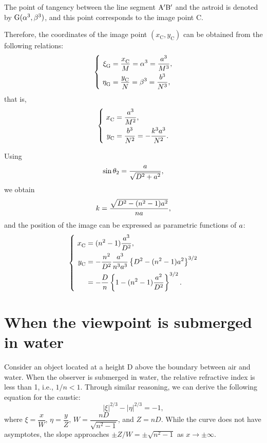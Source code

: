 \documentclass[twocolumn]{article}
\begin{document}
The point of tangency between the line segment ${\mathrm{{A^{\prime}}{B^{\prime}}}}$ and the astroid is denoted by $\mathrm{G}({\alpha}^3, {\beta}^3)$, and this point corresponds to the image point C. 

Therefore, the coordinates of the image point $(x_{\mathrm{C}}^{}, y_{\mathrm{C}}^{})$ can be obtained from the following relations:
$$ \left\{ 
\begin{aligned}
	\xi_{\mathrm{G}}^{} &= \dfrac{x_{\mathrm{C}}^{}}{M} = \greeka^3 = \dfrac{\romana^3}{M^3},\\
	\eta_{\mathrm{G}}^{} &= \dfrac{y_{\mathrm{C}}^{}}{N} = \greekb^3 = \dfrac{\romanb^3}{N^3},
\end{aligned}
\right.$$
that is,
$$\left\{ 
\begin{aligned}
	x_{\mathrm{C}}^{} &= \dfrac{\romana^3}{M^2},\\
	y_{\mathrm{C}}^{} &= \dfrac{\romanb^3}{N^2}=-\dfrac{k^3\romana^3}{N^2}.
\end{aligned}
\right.$$

Using 
$$\sin\theta_2 = \dfrac{{a}}{\sqrt{D^2+{a}^2}},$$
we obtain
$$k = \dfrac{\sqrt{D^2-(n^2-1){a}^2}}{n{a}},$$
and the position of the image can be expressed as parametric functions of ${a}$:
$$ \left\{ 
\begin{aligned}
	x_{\mathrm{C}}^{} &= (n^2-1)\dfrac{\romana^3}{D^2},\\
	y_{\mathrm{C}}^{} &= -\dfrac{n^2}{D^2}\dfrac{\romana^3}
	{n^3\romana^3}\left\{ D^2-(n^2-1)\romana^2 \right\}^{3/2}\\
	&=-\dfrac{D}{n}\left\{ 1-(n^2-1)\dfrac{\romana^2}{D^2} \right\}^{3/2}.
\end{aligned}
\right.$$

\section{When the viewpoint is submerged in water}

Consider an object located at a height D above the boundary between air and water. When the observer is submerged in water, the relative refractive index is less than 1, i.e., $1/n < 1$. Through similar reasoning, we can derive the following equation for the caustic:
$$ \left| \xi \right|^{2/3} - \left| \eta \right|^{2/3} = -1, $$
where $\xi = \dfrac{x}{W} $, $\eta = \dfrac{y}{Z}$, $W = \dfrac{nD}{\sqrt{n^2-1}}$, and $Z = nD$. 
While the curve does not have asymptotes, the slope approaches $\pm Z/W = \pm \sqrt{n^2-1}$ as $x \to \pm\infty$.
\end{document}

